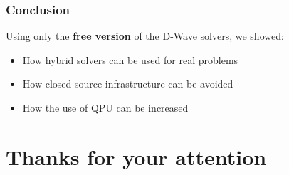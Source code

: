 \documentclass[aspectratio=169]{beamer}
\begin{document}
\begin{frame}
    \frametitle{Conclusion}

    Using only the \textbf{free version} of the D-Wave solvers, we showed:

    \begin{itemize}
        \item How hybrid solvers can be used for real problems
        \item How closed source infrastructure can be avoided
        \item How the use of QPU can be increased
    \end{itemize}
\end{frame}

\section{Thanks for your attention}
\end{document}
